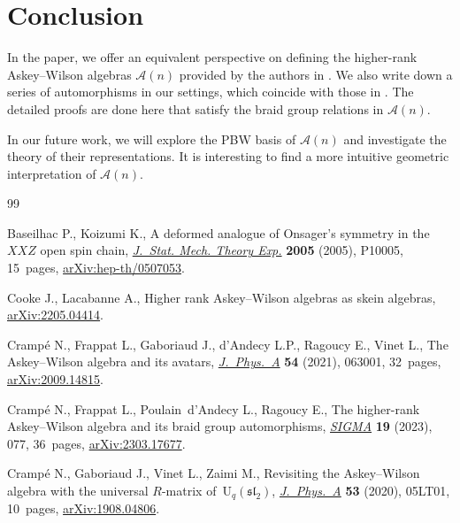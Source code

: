 \documentclass[10pt,a4paper]{amsart}
\numberwithin{equation}{section}
\def\A{\mathscr{A}}
\begin{document}
\section{Conclusion}

In the paper, we offer an equivalent perspective on defining the higher-rank Askey--Wilson algebras $\A(n)$ provided by the authors in \cite{CFPR(2023)}. We also write down a series of automorphisms in our settings, which coincide with those in \cite{CFPR(2023)}. The detailed proofs are done here that satisfy the braid group relations in $\A(n)$.

In our future work, we will explore the PBW basis of $\A(n)$ and investigate the theory of their representations.
It is interesting to find a more intuitive geometric interpretation of $\A(n)$.


\begin{thebibliography}{99}
\footnotesize\itemsep=0pt

Baseilhac P., Koizumi K., A deformed analogue of {O}nsager's symmetry in
 the~{$XXZ$} open spin chain, \href{https://doi.org/10.1088/1742-5468/2005/10/p10005}{\textit{J.~Stat. Mech. Theory Exp.}}
 \textbf{2005} (2005), P10005, 15~pages, \href{https://arxiv.org/abs/hep-th/0507053}{arXiv:hep-th/0507053}.

Cooke J., Lacabanne A., Higher rank {A}skey--{W}ilson algebras as skein
 algebras, \href{https://arxiv.org/abs/2205.04414}{arXiv:2205.04414}.

Cramp\'e N., Frappat L., Gaboriaud J., d'Andecy L.P., Ragoucy E., Vinet L., The
 {A}skey--{W}ilson algebra and its avatars, \href{https://doi.org/10.1088/1751-8121/abd783}{\textit{J.~Phys.~A}} \textbf{54}
 (2021), 063001, 32~pages, \href{https://arxiv.org/abs/2009.14815}{arXiv:2009.14815}.

Cramp\'e N., Frappat L., Poulain~d'Andecy L., Ragoucy E., The higher-rank
 {A}skey--{W}ilson algebra and its braid group automorphisms, \href{https://doi.org/10.3842/SIGMA.2023.077}{\textit{SIGMA}}
 \textbf{19} (2023), 077, 36~pages, \href{https://arxiv.org/abs/2303.17677}{arXiv:2303.17677}.

Cramp\'e N., Gaboriaud J., Vinet L., Zaimi M., Revisiting the {A}skey--{W}ilson
 algebra with the universal {$R$}-matrix of~{$\mathrm{U}_q(\mathfrak{sl}_2)$},
 \href{https://doi.org/10.1088/1751-8121/ab604e}{\textit{J.~Phys.~A}} \textbf{53} (2020), 05LT01, 10~pages,
 \href{https://arxiv.org/abs/1908.04806}{arXiv:1908.04806}.


\end{thebibliography}
\end{document}
